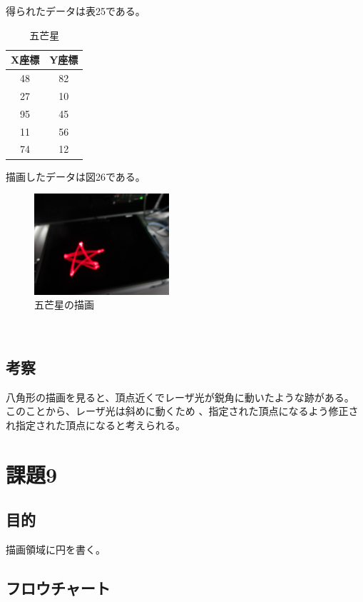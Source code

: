 \documentclass{jarticle}
\begin{document}
得られたデータは表25である。
\begin{table}[H]
    \centering
    \caption{五芒星}
    \begin{tabular}{c|c}
       X座標&Y座標 \\
    \hline\hline
    48 &82　\\
    27 &10\\
    95&45\\
    11&56\\
    74&12\\
    
    \end{tabular}
    
    \label{tab:my_label}
\end{table}
描画したデータは図26である。
\begin{figure}[H]
    \centering
    
    \includegraphics[width=5cm]{IMG_1758.JPG}
    \caption{五芒星の描画}
    \label{fig:my_label}
\end{figure}

\\
\subsection{考察}

八角形の描画を見ると、頂点近くでレーザ光が鋭角に動いたような跡がある。
このことから、レーザ光は斜めに動くため
、指定された頂点になるよう修正され指定された頂点になると考えられる。


\section{課題9}
\subsection{目的}
描画領域に円を書く。

\subsection{フロウチャート}
\end{document}
